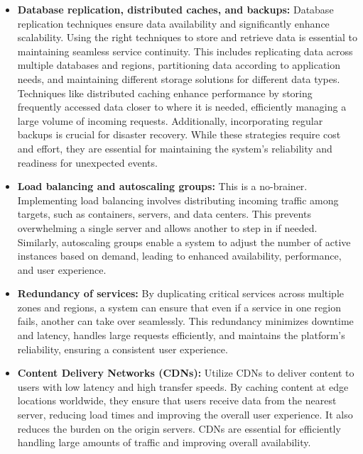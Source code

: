 \begin{itemize}
\item
\protect{}\label{9voLOthFRBNLeAZXEhADI}
\textbf{Database replication, distributed caches, and backups:} Database replication techniques ensure data availability and significantly enhance scalability. Using the right techniques to store and retrieve data is essential to maintaining seamless service continuity. This includes replicating data across multiple databases and regions, partitioning data according to application needs, and maintaining different storage solutions for different data types. Techniques like distributed caching enhance performance by storing frequently accessed data closer to where it is needed, efficiently managing a large volume of incoming requests. Additionally, incorporating regular backups is crucial for disaster recovery. While these strategies require cost and effort, they are essential for maintaining the system's reliability and readiness for unexpected events.
\item
\protect{}\label{cNFK_-e5G5-4sPxiVrSlq}
\textbf{Load balancing and autoscaling groups:} This is a no-brainer. Impleme\-nting load balancing involves distributing incoming traffic among targets, such as containers, servers, and data ce\-nters. This prevents ove\-rwhelming a single serve\-r and allows another to step in if nee\-ded. Similarly, autoscaling groups enable a system to adjust the number of active instances based on demand, le\-ading to enhanced availability, performance, and user experie\-nce.
\item
\protect{}\label{R2OExcIB26Oc7dcJoABXV}
\textbf{Redundancy of services:} By duplicating critical services across multiple zones and regions, a system can ensure that even if a service in one region fails, another can take over seamlessly. This redundancy minimizes downtime and latency, handles large requests efficiently, and maintains the platform's reliability, ensuring a consistent user experience.
\item
\protect{}\label{RykwCeM7ABDAew8G5_eNt}
\textbf{Content Delivery Networks (CDNs):} Utilize CDNs to deliver content to users with low latency and high transfer speeds. By caching content at edge locations worldwide, they ensure that users receive data from the nearest server, reducing load times and improving the overall user experience. It also reduces the burden on the origin servers. CDNs are essential for efficiently handling large amounts of traffic and improving overall availability.

\end{itemize}
